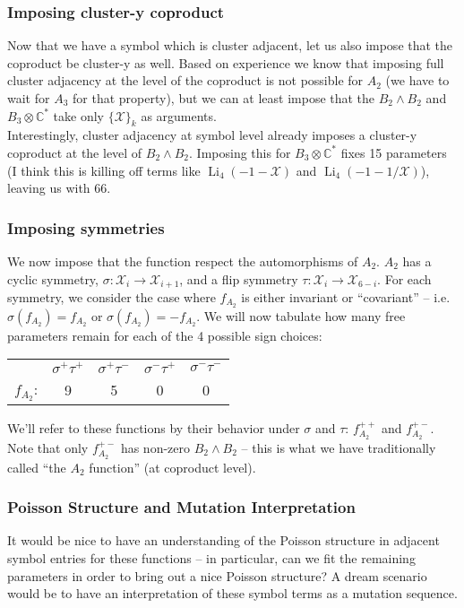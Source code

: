 \documentclass[12pt]{article}
\DeclareMathOperator{\Li}{Li}
\def\x{\mathcal{X}}
\begin{document}
\subsubsection*{Imposing cluster-y coproduct}
Now that we have a symbol which is cluster adjacent, let us also impose that the coproduct be cluster-y as well. Based on experience we know that imposing full cluster adjacency at the level of the coproduct is not possible for $A_2$ (we have to wait for $A_3$ for that property), but we can at least impose that the $B_2\wedge B_2$ and $B_3 \otimes \mathbb{C}^*$ take only $\{\x\}_k$ as arguments. \\

\noindent Interestingly, cluster adjacency at symbol level already imposes a cluster-y coproduct at the level of $B_2\wedge B_2$. Imposing this for $B_3 \otimes \mathbb{C}^*$ fixes 15 parameters (I think this is killing off terms like $\Li_4(-1-\x)$ and $\Li_4(-1-1/\x)$), leaving us with 66.

\subsubsection*{Imposing symmetries}

We now impose that the function respect the automorphisms of $A_2$. $A_2$ has a cyclic symmetry, $\sigma: \x_i\to \x_{i+1}$, and a flip symmetry $\tau: \x_i \to \x_{6-i}$. For each symmetry, we consider the case where $f_{A_2}$ is either invariant or ``covariant'' -- i.e. $\sigma(f_{A_2}) = f_{A_2}$ or $\sigma(f_{A_2}) = -f_{A_2}$. We will now tabulate how many free parameters remain for each of the 4 possible sign choices:
\begin{center}
\begin{tabular}{ rcccc }
\multicolumn{1}{r}{}
 & \multicolumn{1}{c}{$\sigma^+\tau^+$}
 & \multicolumn{1}{c}{$\sigma^+\tau^-$}
 & \multicolumn{1}{c}{$\sigma^-\tau^+$}
 & \multicolumn{1}{c}{$\sigma^-\tau^-$} \\
\cline{2-5}
$f_{A_2}$: & 9 & 5 & 0 & 0 \\
\end{tabular}
\end{center}
We'll refer to these functions by their behavior under $\sigma$ and $\tau$: $f_{A_2}^{++}$ and $f_{A_2}^{+-}$. Note that only $f_{A_2}^{+-}$ has non-zero $B_2\wedge B_2$ -- this is what we have traditionally called ``the $A_2$ function'' (at coproduct level).

\subsubsection*{Poisson Structure and Mutation Interpretation}
It would be nice to have an understanding of the Poisson structure in adjacent symbol entries for these functions -- in particular, can we fit the remaining parameters in order to bring out a nice Poisson structure? A dream scenario would be to have an interpretation of these symbol terms as a mutation sequence. \\
\end{document}
